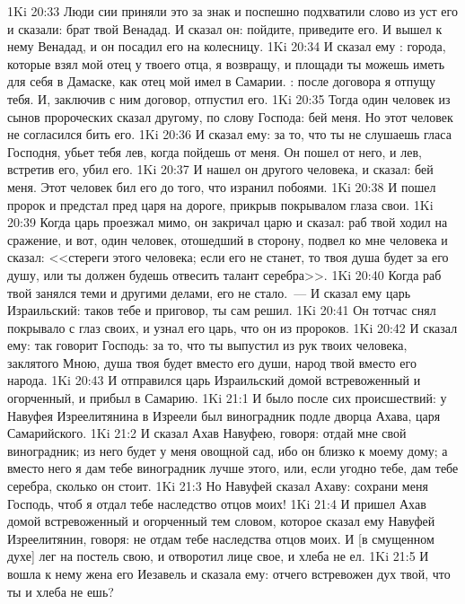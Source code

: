 \vs 1Ki 20:33 Люди сии приняли это за  знак и поспешно подхватили слово из уст его и сказали: брат твой Венадад. И сказал он: пойдите, приведите его. И вышел к нему Венадад, и он посадил его  на колесницу.
\vs 1Ki 20:34 И сказал ему : города, которые взял мой отец у твоего отца, я возвращу, и площади ты можешь иметь для себя в Дамаске, как отец мой имел в Самарии. : после договора я отпущу тебя. И, заключив с ним договор, отпустил его.
\rsbpar\vs 1Ki 20:35 Тогда один человек из сынов пророческих сказал другому, по слову Господа: бей меня. Но этот человек не согласился бить его.
\vs 1Ki 20:36 И сказал ему: за то, что ты не слушаешь гласа Господня, убьет тебя лев, когда пойдешь от меня. Он пошел от него, и лев, встретив его, убил его.
\vs 1Ki 20:37 И нашел он другого человека, и сказал: бей меня. Этот человек бил его до того, что изранил побоями.
\vs 1Ki 20:38 И пошел пророк и предстал пред царя на дороге, прикрыв покрывалом глаза свои.
\vs 1Ki 20:39 Когда царь проезжал мимо, он закричал царю и сказал: раб твой ходил на сражение, и вот, один человек, отошедший в сторону, подвел ко мне человека и сказал: <<стереги этого человека; если его не станет, то твоя душа будет за его душу, или ты должен будешь отвесить талант серебра>>.
\vs 1Ki 20:40 Когда раб твой занялся теми и другими делами, его не стало.~--- И сказал ему царь Израильский: таков тебе и приговор, ты сам решил.
\vs 1Ki 20:41 Он тотчас снял покрывало с глаз своих, и узнал его царь, что он из пророков.
\vs 1Ki 20:42 И сказал ему: так говорит Господь: за то, что ты выпустил из рук твоих человека, заклятого Мною, душа твоя будет вместо его души, народ твой вместо его народа.
\vs 1Ki 20:43 И отправился царь Израильский домой встревоженный и огорченный, и прибыл в Самарию.
\vs 1Ki 21:1 И было после сих происшествий: у Навуфея Изреелитянина в Изреели был виноградник подле дворца Ахава, царя Самарийского.
\vs 1Ki 21:2 И сказал Ахав Навуфею, говоря: отдай мне свой виноградник; из него будет у меня овощной сад, ибо он близко к моему дому; а вместо него я дам тебе виноградник лучше этого, или, если угодно тебе, дам тебе серебра, сколько он стоит.
\vs 1Ki 21:3 Но Навуфей сказал Ахаву: сохрани меня Господь, чтоб я отдал тебе наследство отцов моих!
\vs 1Ki 21:4 И пришел Ахав домой встревоженный и огорченный тем словом, которое сказал ему Навуфей Изреелитянин, говоря: не отдам тебе наследства отцов моих. И [в смущенном духе] лег на постель свою, и отворотил лице свое, и хлеба не ел.
\vs 1Ki 21:5 И вошла к нему жена его Иезавель и сказала ему: отчего встревожен дух твой, что ты и хлеба не ешь?
